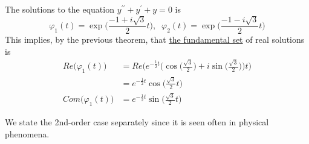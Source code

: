 \documentclass{article}
\newcounter{theorem}[section]
\newcounter{example}[section]
\begin{document}
      \begin{example}[Solving $y'' + y' + y = 0$]
        \label{ex:solving-yyy0}
      The solutions to the equation $y^{\prime \prime} + y^\prime + y = 0$ is 
      \begin{equation}
        \varphi_1 (t) = \exp \Big(\frac{-1+i\sqrt{3}}{2} t \Big), \;\; \varphi_2 (t) = \exp \Big( \frac{-1 - i \sqrt{3}}{2} t\Big)
      \end{equation}
      This implies, by the previous theorem, that \hyperref[thm:the-fundamental-set]{the fundamental set} of real solutions is
      \begin{align*}
          Re \big(\varphi_1 (t)\big) & = Re \bigg( e^{-\frac{1}{2} t} \Big( \cos{\Big(\frac{\sqrt{3}}{2}\Big)} + i \sin{\Big(\frac{\sqrt{3}}{2}\Big)}\Big) t\bigg) \\
          & = e^{-\frac{1}{2} t} \cos{\Big(\frac{\sqrt{3}}{2} t\Big)}  \\
          Com \big(\varphi_1 (t)\big) & = e^{-\frac{1}{2} t} \sin{\Big(\frac{\sqrt{3}}{2} t\Big)} 
      \end{align*}
      \end{example}

      We state the 2nd-order case separately since it is seen often in physical phenomena. 
\end{document}
